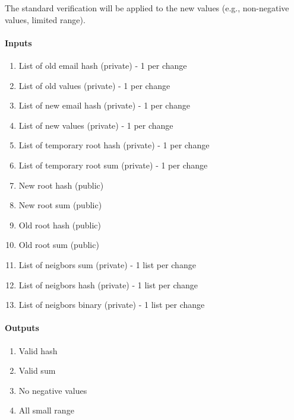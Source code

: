 The standard verification will be applied to the new values (e.g., non-negative values, limited range).

\paragraph{Inputs}
\begin{enumerate}

    \item List of old email hash (private) - 1 per change
    
    \item List of old values (private) - 1 per change

    \item List of new email hash (private) - 1 per change
    
    \item List of new values (private) - 1 per change

    \item List of temporary root hash (private) - 1 per change
    
    \item List of temporary root sum (private) - 1 per change

    \item New root hash (public)

    \item New root sum (public)

    \item Old root hash (public)

    \item Old root sum (public)

    \item List of neigbors sum (private) - 1 list per change

    \item List of neigbors hash (private) - 1 list per change

    \item List of neigbors binary (private) - 1 list per change
    
    \end{enumerate}

    \paragraph{Outputs}
    \begin{enumerate}
        \item Valid hash 
        \item Valid sum 
        \item No negative values 
        \item All small range 
        \end{enumerate}

